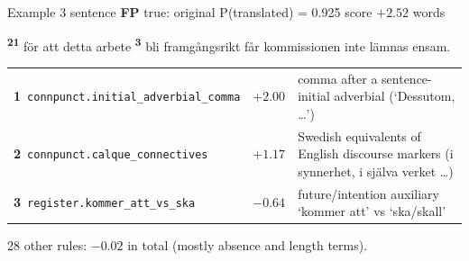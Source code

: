 \begin{exbox}[unbreakable]{Example 3 \quad sentence \quad \textbf{FP} \quad true: original \quad P(translated) = 0.925 \quad score $+2.52$  words}
{\setlength{\parindent}{0pt}\raggedright {}\textsuperscript{\sffamily\bfseries 2}\highLight[tsT!70]{,}\textsuperscript{\sffamily\bfseries 1} för att detta arbete \textsuperscript{\sffamily\bfseries 3} bli framgångsrikt får kommissionen inte lämnas ensam.}\par{}
\par\medskip
{\footnotesize
\begin{tabularx}{\linewidth}{@{}l r X@{}}
\textbf{1}~\texttt{connpunct.initial\_adverbial\_comma} & $+2.00$ & comma after a sentence-initial adverbial (`Dessutom, \ldots{}') \\
\textbf{2}~\texttt{connpunct.calque\_connectives} & $+1.17$ & Swedish equivalents of English discourse markers (i synnerhet, i själva verket \ldots{}) \\
\textbf{3}~\texttt{register.kommer\_att\_vs\_ska} & $-0.64$ & future/intention auxiliary `kommer att' vs `ska/skall' \\
\end{tabularx}
\par 28 other rules: $-0.02$ in total (mostly absence and length terms).}
\par{}
\end{exbox}

